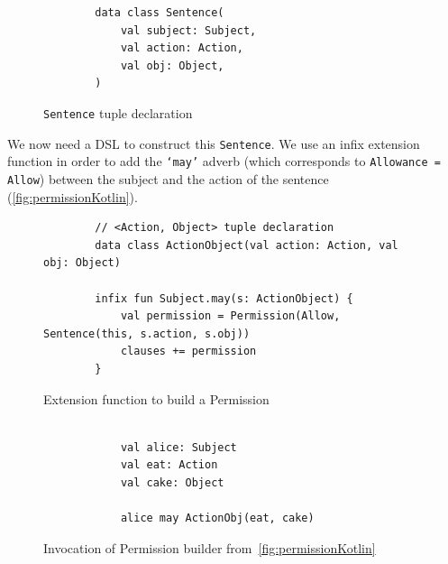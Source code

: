 \begin{figure}[h]
    \centering
    \begin{minipage}{0.4\textwidth}
        \begin{verbatim}
        data class Sentence(
            val subject: Subject,
            val action: Action,
            val obj: Object,
        )
        \end{verbatim}
    \end{minipage}
    \caption{\texttt{Sentence} tuple declaration}\label{fig:kotlinSentence}
\end{figure}

We now need a DSL to construct this \texttt{Sentence}.
We use an infix extension function in order to add the \texttt{`may'} adverb (which corresponds to \texttt{Allowance = Allow}) between the subject and the action of the sentence (\autoref{fig:permissionKotlin}).



\begin{figure}[h]
    \centering
    \begin{minipage}{\textwidth}
        \begin{verbatim}
        // <Action, Object> tuple declaration
        data class ActionObject(val action: Action, val obj: Object)

        infix fun Subject.may(s: ActionObject) {
            val permission = Permission(Allow, Sentence(this, s.action, s.obj))
            clauses += permission
        }
        \end{verbatim}
    \end{minipage}
    \caption{Extension function to build a Permission}\label{fig:permissionKotlin}
\end{figure}



\begin{figure}[h]
    \centering
    \begin{minipage}{0.5\textwidth}
        \begin{verbatim}

            val alice: Subject
            val eat: Action
            val cake: Object

            alice may ActionObj(eat, cake)
        \end{verbatim}
    \end{minipage}
    \caption{Invocation of Permission builder from~\autoref{fig:permissionKotlin}}
    \label{fig:permissionUse}
\end{figure}

